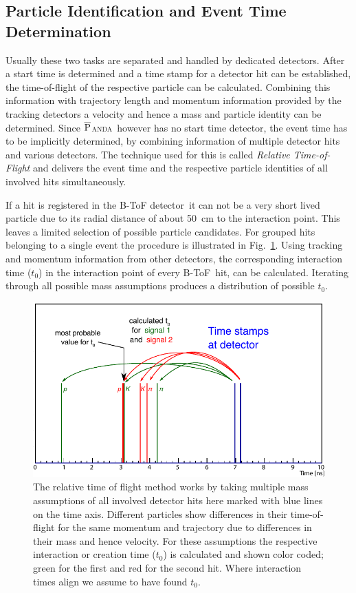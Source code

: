 \documentclass[12pt,a4paper,oneside]{article}
\newcommand{\fig}{Fig.}
\newcommand{\panda}{\textsc{$\overline{\textsc{P}}$anda}}
\newcommand{\btof}{B-ToF}
\newcommand{\btofD}{B-ToF detector}
\begin{document}

\subsection{Particle Identification and Event Time Determination}

Usually these two tasks are separated and handled by dedicated detectors.
After a start time is determined and a time stamp for a detector hit can be established, the time-of-flight of the respective particle can be calculated.
Combining this information with trajectory length and momentum information provided by the tracking detectors a velocity and hence a mass and particle identity can be determined.
Since \panda\ however has no start time detector, the event time has to be implicitly determined, by combining information of multiple detector hits and various detectors.
The technique used for this is called \emph{Relative Time-of-Flight} and delivers the event time and the respective particle identities of all involved hits simultaneously.

If a hit is registered in the \btofD\ it can not be a very short lived particle due to its radial distance of about \SI{50}{cm} to the interaction point.
This leaves a limited selection of possible particle candidates.
For grouped hits belonging to a single event the procedure is illustrated in \fig ~\ref{fig:relToF}.
Using tracking and momentum information from other detectors, the corresponding interaction time ($t_0$) in the interaction point of every \btof\ hit, can be calculated.
Iterating through all possible mass assumptions produces a distribution of possible $t_0$.
 
\begin{figure}
	\centering
	\includegraphics[width=.9\textwidth]{fig/relTof_basic.pdf}
	\caption{The relative time of flight method works by taking multiple mass assumptions of all involved detector hits here marked with blue lines on the time axis. Different
particles show differences in their time-of-flight for the same momentum and trajectory
due to differences in their mass and hence velocity. For these assumptions the respective
interaction or creation time ($t_0$) is calculated and shown color coded; green for the first and
red for the second hit. Where interaction times align we assume to have found $t_0$.}
	\label{fig:relToF}
\end{figure}
\end{document}
